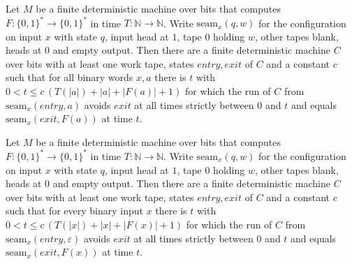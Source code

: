 \begin{theorem}
\label{Turing.NTimeDiag.qy_installSpec}
\leanok
{}
Let $M$ be a finite deterministic machine over bits that computes $F : \{0,1\}^* \to \{0,1\}^*$
in time $T : \mathbb{N} \to \mathbb{N}$. Write $\mathrm{seam}_x(q, w)$ for the configuration on
input $x$ with state $q$, input head at $1$, tape $0$ holding $w$, other tapes blank, heads at
$0$ and empty output. Then there are a finite deterministic machine $C$ over bits with at least one
work tape, states $\mathit{entry}, \mathit{exit}$ of $C$ and a constant $c$ such that for all
binary words $x, a$ there is $t$ with $0 < t \le c\,(T(|a|) + |a| + |F(a)| + 1)$ for which the run
of $C$ from $\mathrm{seam}_x(\mathit{entry}, a)$ avoids $\mathit{exit}$ at all times strictly
between $0$ and $t$ and equals $\mathrm{seam}_x(\mathit{exit}, F(a))$ at time $t$.
\end{theorem}

\begin{theorem}
\label{Turing.NTimeDiag.qy_inputSpec}
\leanok
{}
Let $M$ be a finite deterministic machine over bits that computes $F : \{0,1\}^* \to \{0,1\}^*$
in time $T : \mathbb{N} \to \mathbb{N}$. Write $\mathrm{seam}_x(q, w)$ for the configuration on
input $x$ with state $q$, input head at $1$, tape $0$ holding $w$, other tapes blank, heads at
$0$ and empty output. Then there are a finite deterministic machine $C$ over bits with at least one
work tape, states $\mathit{entry}, \mathit{exit}$ of $C$ and a constant $c$ such that for every
binary input $x$ there is $t$ with $0 < t \le c\,(T(|x|) + |x| + |F(x)| + 1)$ for which the run of
$C$ from $\mathrm{seam}_x(\mathit{entry}, \varepsilon)$ avoids $\mathit{exit}$ at all times
strictly between $0$ and $t$ and equals $\mathrm{seam}_x(\mathit{exit}, F(x))$ at time $t$.
\end{theorem}

